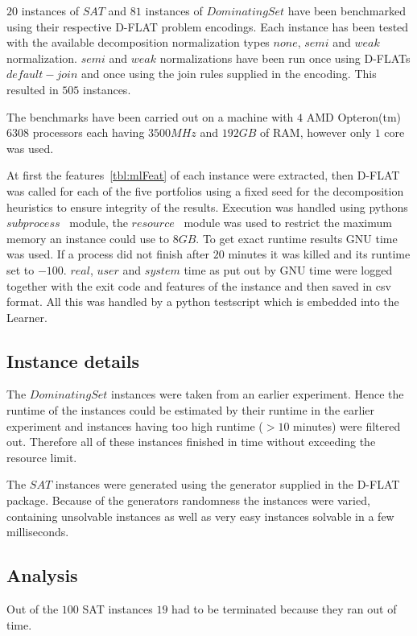 $20$ instances of $SAT$ and $81$ instances of $Dominating Set$ have been benchmarked using their respective D-FLAT problem encodings. Each instance has been tested with the available decomposition normalization types $none$, $semi$ and $weak$ normalization. $semi$ and $weak$ normalizations have been run once using D-FLATs $default-join$ and once using the join rules supplied in the encoding. This resulted in $505$ instances.

The benchmarks have been carried out on a machine with $4$ AMD Opteron(tm) $6308$ processors each having $3500 MHz$ and $192GB$ of RAM, however only $1$ core was used.

At first the features~\ref{tbl:mlFeat} of each instance were extracted, then D-FLAT was called for each of the five portfolios using a fixed seed for the decomposition heuristics to ensure integrity of the results.
Execution was handled using pythons $subprocess$~\cite{www:subprocess} module, the $resource$~\cite{www:resource} module was used to restrict the maximum memory an instance could use to $8 GB$. To get exact runtime results GNU time~\cite{www:time} was used. If a process did not finish after $20$ minutes it was killed and its runtime set to $-100$. $real$, $user$ and $system$ time as put out by GNU time were logged together with the exit code and features of the instance and then saved in csv format. All this was handled by a python testscript which is embedded into the Learner.

\subsection{Instance details}
The $Dominating Set$ instances were taken from an earlier experiment. Hence the runtime of the instances could be estimated by their runtime in the earlier experiment and instances having too high runtime ($>10$ minutes) were filtered out. Therefore all of these instances finished in time without exceeding the resource limit.

The $SAT$ instances were generated using the generator supplied in the D-FLAT package. Because of the generators randomness the instances were varied, containing unsolvable instances as well as very easy instances solvable in a few milliseconds.

\subsection{Analysis}
Out of the $100$ SAT instances $19$ had to be terminated because they ran out of time.
